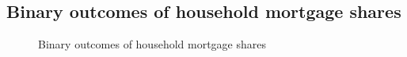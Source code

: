 \documentclass[
  letterpaper,
  DIV=11,
  numbers=noendperiod]{scrartcl}
\begin{document}
\subsection{Binary outcomes of household mortgage
shares}\label{binary-outcomes-of-household-mortgage-shares}

\begin{figure}[H]


\caption{\label{fig-binary}Binary outcomes of household mortgage shares}

\end{figure}%
\end{document}
